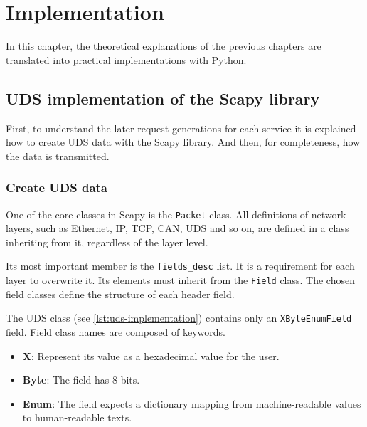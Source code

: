 \chapter{Implementation}

In this chapter, the theoretical explanations of the previous chapters are translated into practical implementations with Python.


\section{UDS implementation of the Scapy library}

First, to understand the later request generations for each service it is explained how to create UDS data with the Scapy library. 
And then, for completeness, how the data is transmitted.

\subsection{Create UDS data}

One of the core classes in Scapy is the \texttt{Packet} class. 
All definitions of network layers, such as Ethernet, IP, TCP, CAN, UDS and so on, are defined in a class inheriting from it, regardless of the layer level.

Its most important member is the \texttt{fields_desc} list. 
It is a requirement for each layer to overwrite it. Its elements must inherit from the \texttt{Field} class. 
The chosen field classes define the structure of each header field.


The UDS class (see \autoref{lst:uds-implementation}) contains only an \texttt{XByteEnumField} field. Field class names are composed of keywords.
\begin{samepage}
\begin{itemize}
    \item \textbf{X}: Represent its value as a hexadecimal value for the user.
    \item \textbf{Byte}: The field has 8 bits.
    \item \textbf{Enum}: The field expects a dictionary mapping from machine-readable values to human-readable texts.
\end{itemize}
\end{samepage}

